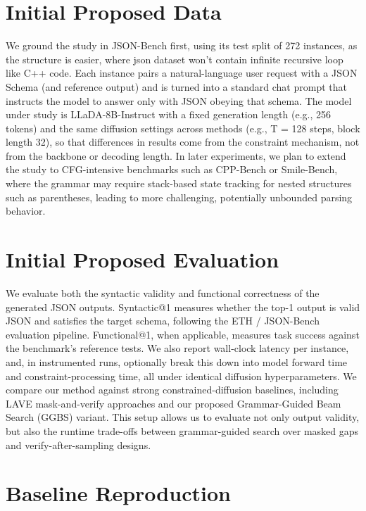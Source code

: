 \section{Initial Proposed Data}

We ground the study in JSON-Bench first, using its test split of 272 instances, as the structure is easier, where json dataset won't contain infinite recursive loop like C++ code. Each instance pairs a natural-language user request with a JSON Schema (and reference output) and is turned into a standard chat prompt that instructs the model to answer only with JSON obeying that schema. The model under study is LLaDA-8B-Instruct with a fixed generation length (e.g., 256 tokens) and the same diffusion settings across methods (e.g., T = 128 steps, block length 32), so that differences in results come from the constraint mechanism, not from the backbone or decoding length. In later experiments, we plan to extend the study to CFG-intensive benchmarks such as CPP-Bench or Smile-Bench, where the grammar may require stack-based state tracking for nested structures such as parentheses, leading to more challenging, potentially unbounded parsing behavior.



\section{Initial Proposed Evaluation}
We evaluate both the syntactic validity and functional correctness of the generated JSON outputs. Syntactic@1 measures whether the top-1 output is valid JSON and satisfies the target schema, following the ETH / JSON-Bench evaluation pipeline. Functional@1, when applicable, measures task success against the benchmark’s reference tests. We also report wall-clock latency per instance, and, in instrumented runs, optionally break this down into model forward time and constraint-processing time, all under identical diffusion hyperparameters. We compare our method against strong constrained-diffusion baselines, including LAVE mask-and-verify approaches and our proposed Grammar-Guided Beam Search (GGBS) variant. This setup allows us to evaluate not only output validity, but also the runtime trade-offs between grammar-guided search over masked gaps and verify-after-sampling designs.



\section{Baseline Reproduction}

